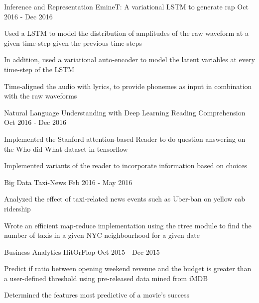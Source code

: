 \begin{cventries}
  \cventry
    {Inference and Representation}
    {EmineT: A variational LSTM to generate rap}
    {}
    {Oct 2016 -  Dec 2016}
    {
      \begin{cvitems}
        \item {Used a LSTM to model the distribution of amplitudes of the raw waveform at a given time-step given the previous time-steps}
        \item {In addition, used a variational auto-encoder to model the latent variables at every time-step of the LSTM}
        \item {Time-aligned the audio with lyrics, to provide phonemes as input in combination with the raw waveforms} 
      \end{cvitems}
    }
  \cventry
    {Natural Language Understanding with Deep Learning}
    {Reading Comprehension}
    {}
    {Oct 2016 -  Dec 2016}
    {
      \begin{cvitems}
        \item {Implemented the Stanford attention-based Reader to do question answering on the Who-did-What dataset in tensorflow}
        \item {Implemented variants of the reader to incorporate information based on choices}
      \end{cvitems}
    }
  \cventry
    {Big Data}
    {Taxi-News}
    {}
    {Feb 2016 - May 2016}
    {
      \begin{cvitems}
        \item {Analyzed the effect of taxi-related news events such as Uber-ban on yellow cab ridership}
        \item {Wrote an efficient map-reduce implementation using the rtree module to find the number of taxis in a given NYC neighbourhood for a given date}
      \end{cvitems}
    }
  \cventry
    {Business Analytics}
    {HitOrFlop}
    {}
    {Oct 2015 - Dec 2015}
    {
      \begin{cvitems}
        \item {Predict if ratio between opening weekend revenue and the budget is greater than a user-defined threshold using pre-released data mined from iMDB}
        \item {Determined the features most predictive of a movie's success}
      \end{cvitems}
    }
\end{cventries}
